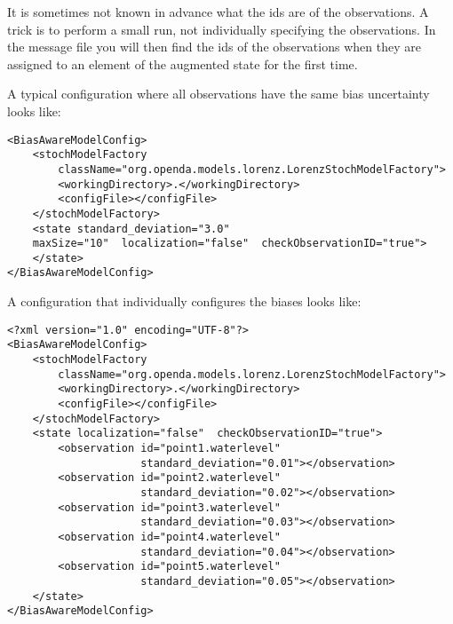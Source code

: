It is sometimes not known in advance what the ids are of the observations. A trick is to perform a small run, not individually specifying the observations. In the message file you will then find the ids of the observations when they are assigned to an element of the augmented state for the first time.

A typical configuration where all observations have the same bias uncertainty looks like:
\begin{verbatim}
<BiasAwareModelConfig>
	<stochModelFactory
		className="org.openda.models.lorenz.LorenzStochModelFactory">
		<workingDirectory>.</workingDirectory>
		<configFile></configFile>
	</stochModelFactory>
	<state standard_deviation="3.0"
	maxSize="10"  localization="false"  checkObservationID="true">
	</state>
</BiasAwareModelConfig>
\end{verbatim}

A configuration that individually configures the biases looks like:
\begin{verbatim}
<?xml version="1.0" encoding="UTF-8"?>
<BiasAwareModelConfig>
	<stochModelFactory
		className="org.openda.models.lorenz.LorenzStochModelFactory">
		<workingDirectory>.</workingDirectory>
		<configFile></configFile>
	</stochModelFactory>
	<state localization="false"  checkObservationID="true">
		<observation id="point1.waterlevel"
		             standard_deviation="0.01"></observation>
		<observation id="point2.waterlevel" 
		             standard_deviation="0.02"></observation>
		<observation id="point3.waterlevel"
		             standard_deviation="0.03"></observation>
		<observation id="point4.waterlevel" 
		             standard_deviation="0.04"></observation>
		<observation id="point5.waterlevel" 
		             standard_deviation="0.05"></observation>
	</state>
</BiasAwareModelConfig>
\end{verbatim}


